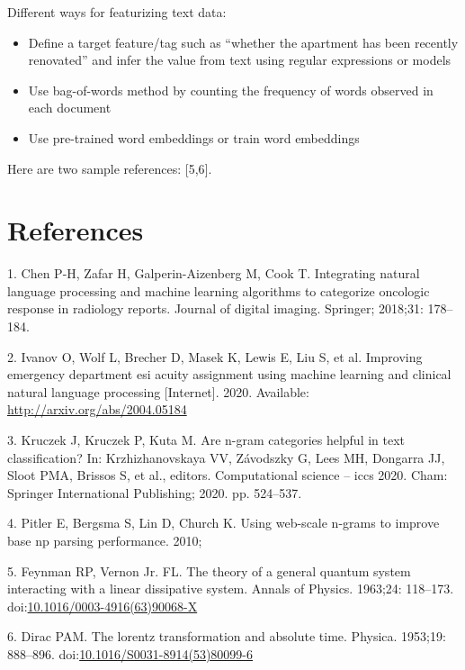 \documentclass[10pt,letterpaper]{article}
\providecommand{\tightlist}{%
  \setlength{\itemsep}{0pt}\setlength{\parskip}{0pt}}
\begin{document}
Different ways for featurizing text data:

\begin{itemize}
\tightlist
\item
  Define a target feature/tag such as ``whether the apartment has been
  recently renovated'' and infer the value from text using regular
  expressions or models
\item
  Use bag-of-words method by counting the frequency of words observed in
  each document
\item
  Use pre-trained word embeddings or train word embeddings
\end{itemize}

Here are two sample references: {[}5,6{]}.

\hypertarget{references}{%
\section*{References}\label{references}}

\hypertarget{refs}{}
\leavevmode\hypertarget{ref-chen2018integrating}{}%
1. Chen P-H, Zafar H, Galperin-Aizenberg M, Cook T. Integrating natural
language processing and machine learning algorithms to categorize
oncologic response in radiology reports. Journal of digital imaging.
Springer; 2018;31: 178--184.

\leavevmode\hypertarget{ref-ivanov2020improving}{}%
2. Ivanov O, Wolf L, Brecher D, Masek K, Lewis E, Liu S, et al.
Improving emergency department esi acuity assignment using machine
learning and clinical natural language processing {[}Internet{]}. 2020.
Available: \url{http://arxiv.org/abs/2004.05184}

\leavevmode\hypertarget{ref-kruczekngrams}{}%
3. Kruczek J, Kruczek P, Kuta M. Are n-gram categories helpful in text
classification? In: Krzhizhanovskaya VV, Závodszky G, Lees MH, Dongarra
JJ, Sloot PMA, Brissos S, et al., editors. Computational science -- iccs
2020. Cham: Springer International Publishing; 2020. pp. 524--537.

\leavevmode\hypertarget{ref-pitler2010using}{}%
4. Pitler E, Bergsma S, Lin D, Church K. Using web-scale n-grams to
improve base np parsing performance. 2010;

\leavevmode\hypertarget{ref-Feynman1963118}{}%
5. Feynman RP, Vernon Jr. FL. The theory of a general quantum system
interacting with a linear dissipative system. Annals of Physics.
1963;24: 118--173.
doi:\href{https://doi.org/10.1016/0003-4916(63)90068-X}{10.1016/0003-4916(63)90068-X}

\leavevmode\hypertarget{ref-Dirac1953888}{}%
6. Dirac PAM. The lorentz transformation and absolute time. Physica.
1953;19: 888--896.
doi:\href{https://doi.org/10.1016/S0031-8914(53)80099-6}{10.1016/S0031-8914(53)80099-6}

\nolinenumbers
\end{document}
